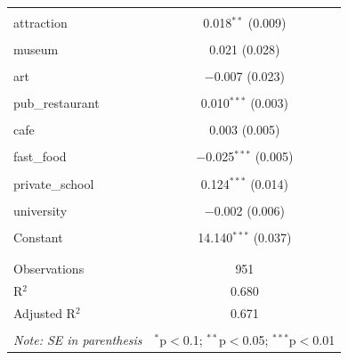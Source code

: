 \documentclass{article}
\begin{document}
\begin{table}[H]
\begin{tabular}{@{\extracolsep{-10pt}}lc}
  & \\ 
 attraction & 0.018$^{**}$ (0.009) \\ 
  & \\ 
 museum & 0.021 (0.028) \\ 
  & \\ 
 art & $-$0.007 (0.023) \\ 
  & \\ 
 pub\_restaurant & 0.010$^{***}$ (0.003) \\ 
  & \\ 
 cafe & 0.003 (0.005) \\ 
  & \\ 
 fast\_food & $-$0.025$^{***}$ (0.005) \\ 
  & \\ 
 private\_school & 0.124$^{***}$ (0.014) \\ 
  & \\ 
 university & $-$0.002 (0.006) \\ 
  & \\ 
 Constant & 14.140$^{***}$ (0.037) \\ 
  & \\ 
\hline \\[-1.8ex] 
Observations & 951 \\ 
R$^{2}$ & 0.680 \\ 
Adjusted R$^{2}$ & 0.671 \\ 
\hline 
\hline \\[-1.8ex] 
\textit{Note: SE in parenthesis}  & \multicolumn{1}{r}{$^{*}$p$<$0.1; $^{**}$p$<$0.05; $^{***}$p$<$0.01} \\ 
\end{tabular} 
\end{table} 
\end{document}
